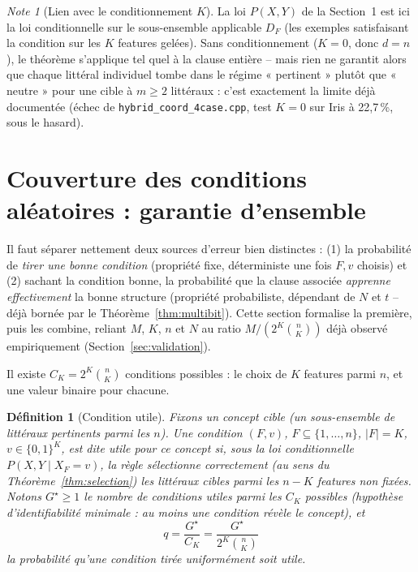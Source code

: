 \documentclass[12pt,a4paper]{article}
\newtheorem{definition}[theorem]{Définition}
\theoremstyle{remark}
\newtheorem{note}{Note}[section]
\begin{document}
\begin{note}[Lien avec le conditionnement $K$]
La loi $P(X,Y)$ de la Section~1 est ici la loi conditionnelle sur le
sous-ensemble applicable $D_F$ (les exemples satisfaisant la condition sur les $K$
features gelées). Sans conditionnement ($K=0$, donc $d=n$), le théorème
s'applique tel quel à la clause entière -- mais rien ne garantit alors que
chaque littéral individuel tombe dans le régime « pertinent » plutôt que
« neutre » pour une cible à $m\ge2$ littéraux : c'est exactement la limite déjà
documentée (échec de \texttt{hybrid\_coord\_4case.cpp}, test $K{=}0$ sur Iris à
22,7\,\%, sous le hasard).
\end{note}

\section{Couverture des conditions aléatoires : garantie d'ensemble}

Il faut séparer nettement deux sources d'erreur bien distinctes : (1) la
probabilité de \emph{tirer une bonne condition} (propriété fixe, déterministe
une fois $F,v$ choisis) et (2) sachant la condition bonne, la probabilité que
la clause associée \emph{apprenne effectivement} la bonne structure
(propriété probabiliste, dépendant de $N$ et $t$ -- déjà bornée par le
Théorème~\ref{thm:multibit}). Cette section formalise la première, puis les
combine, reliant $M$, $K$, $n$ et $N$ au ratio $M/(2^K\binom{n}{K})$ déjà
observé empiriquement (Section~\ref{sec:validation}).

Il existe $C_K=2^K\binom{n}{K}$ conditions possibles : le choix de $K$
features parmi $n$, et une valeur binaire pour chacune.

\begin{definition}[Condition utile]\label{def:condition-utile}
Fixons un concept cible (un sous-ensemble de littéraux pertinents parmi les
$n$). Une condition $(F,v)$, $F\subseteq\{1,\ldots,n\}$, $|F|=K$, $v\in\{0,1\}^K$,
est dite \emph{utile} pour ce concept si, sous la loi conditionnelle
$P(X,Y\mid X_F=v)$, la règle sélectionne correctement (au sens du
Théorème~\ref{thm:selection}) les littéraux cibles parmi les $n-K$ features
non fixées. Notons $G^\star\ge1$ le nombre de conditions utiles parmi les
$C_K$ possibles (hypothèse d'identifiabilité minimale : au moins une
condition révèle le concept), et
\[
  q = \frac{G^\star}{C_K} = \frac{G^\star}{2^K\binom{n}{K}}
\]
la probabilité qu'une condition tirée uniformément soit utile.
\end{definition}
\end{document}
